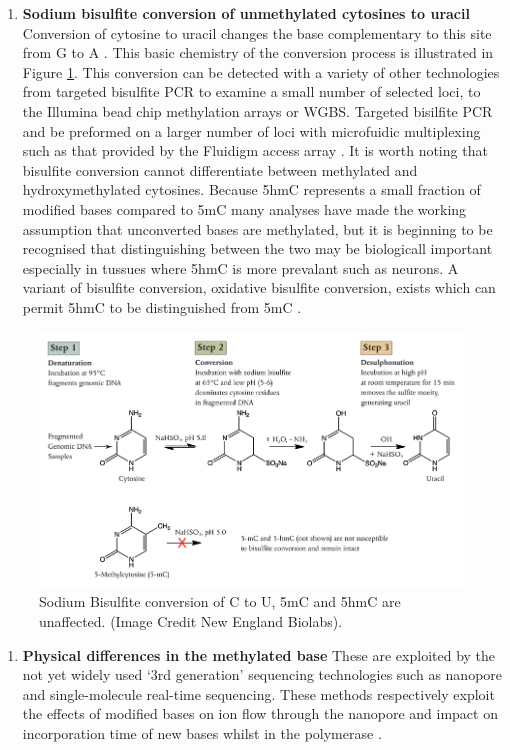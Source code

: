 \documentclass[
]{book}
\providecommand{\tightlist}{%
  \setlength{\itemsep}{0pt}\setlength{\parskip}{0pt}}
\begin{document}
\begin{enumerate}
\item
  \textbf{Sodium bisulfite conversion of unmethylated cytosines to uracil}
  Conversion of cytosine to uracil changes the base complementary to this site from G to A \citep{Hayatsu1970}. This basic chemistry of the conversion process is illustrated in Figure \ref{fig:BisulfiteConversionNEB}. This conversion can be detected with a variety of other technologies from targeted bisulfite PCR to examine a small number of selected loci, to the Illumina bead chip methylation arrays or WGBS. Targeted bisilfite PCR and be preformed on a larger number of loci with microfuidic multiplexing such as that provided by the Fluidigm access array \citep{Adamowicz2018}. It is worth noting that bisulfite conversion cannot differentiate between methylated and hydroxymethylated cytosines. Because 5hmC represents a small fraction of modified bases compared to 5mC many analyses have made the working assumption that unconverted bases are methylated, but it is beginning to be recognised that distinguishing between the two may be biologicall important especially in tussues where 5hmC is more prevalant such as neurons. A variant of bisulfite conversion, oxidative bisulfite conversion, exists which can permit 5hmC to be distinguished from 5mC \citep{Skvortsova2017}.
\end{enumerate}

\begin{figure}

{\centering \includegraphics[width=0.8\linewidth]{figs/BisulfiteConversionNEB} 

}

\caption{Sodium Bisulfite conversion of C to U, 5mC and 5hmC are unaffected. (Image Credit New England Biolabs).}\label{fig:BisulfiteConversionNEB}
\end{figure}



\begin{enumerate}
\def\labelenumi{\arabic{enumi}.}
\setcounter{enumi}{3}
\tightlist
\item
  \textbf{Physical differences in the methylated base}
  These are exploited by the not yet widely used `3rd generation' sequencing technologies such as nanopore and single-molecule real-time sequencing. These methods respectively exploit the effects of modified bases on ion flow through the nanopore and impact on incorporation time of new bases whilst in the polymerase \citep[\citet{Simpson2017}]{Rhoads2015}.
\end{enumerate}
\end{document}
